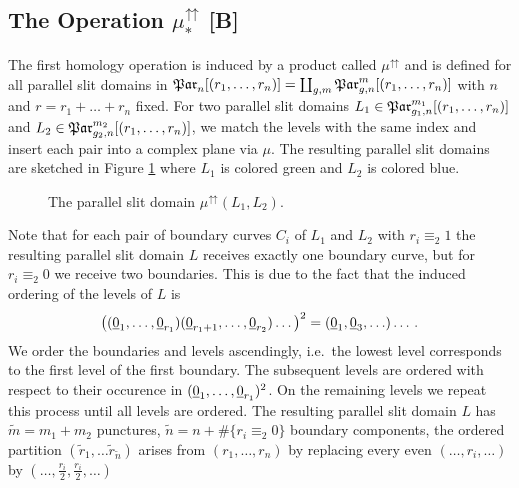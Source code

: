 \subsection{The Operation \texorpdfstring{$\mu^{\upuparrows}_\ast$}{muupuparrows*} [B]}
\label{homology_operations:parallel_patching_slit_pics:construction_of_mu_upuparrows}
The first homology operation is induced by a product called $\mu^{\upuparrows}$
\label{page:shorthand_par_n_r}%
and is defined for all parallel slit domains in $\Par_n[(r_1, \ldots, r_n)] = \coprod_{g,m} \Par_{g,n}^m[(r_1, \ldots, r_n)]$ with $n$ and $r=r_1 + \ldots + r_n$ fixed.
For two parallel slit domains $L_1 \in \Par_{g_1,n}^{m_1}[(r_1, \ldots, r_n)]$ and $L_2 \in \Par_{g_2,n}^{m_2}[(r_1, \ldots, r_n)]$,
we match the levels with the same index and insert each pair into a complex plane via $\mu$.
The resulting parallel slit domains are sketched in Figure \ref{homology_operations:parallel_patching_slit_pics:mu_upuparrows} where $L_1$ is colored green and $L_2$ is colored blue.
\begin{figure}[ht]
    \centering
    \def\svgwidth{.85\columnwidth}
    
    \caption{\label{homology_operations:parallel_patching_slit_pics:mu_upuparrows}The parallel slit domain $\mu^\upuparrows(L_1, L_2)$.}
\end{figure}
Note that for each pair of boundary curves $C_i$ of $L_1$ and $L_2$ with $r_i \equiv_{2} 1$ the resulting parallel slit domain $L$ receives exactly one boundary curve,
but for $r_i \equiv_{2} 0$ we receive two boundaries.
This is due to the fact that the induced ordering of the levels of $L$ is
\[
    \big( ( \ul0_1, \ldots, \ul0_{r_1} )( \ul0_{r_1+1}, \ldots, \ul0_{r_2} ) \ldots \big)^2 = ( \ul0_1, \ul0_3, \ldots ) \ldots \,.
\]
We order the boundaries and levels ascendingly, i.e.\ the lowest level corresponds to the first level of the first boundary.
The subsequent levels are ordered with respect to their occurence in $( \ul0_1, \ldots, \ul0_{r_1} )^2$.
On the remaining levels we repeat this process until all levels are ordered.
The resulting parallel slit domain $L$ has $\tilde m = m_1 + m_2$ punctures,
$\tilde n = n + \#\{ r_i \equiv_2 0\}$ boundary components,
the ordered partition $(\tilde r_1, \ldots \tilde r_{\tilde n})$ arises from $(r_1, \ldots, r_n)$ by replacing every even $(\ldots, r_i, \ldots )$ by $(\ldots, \frac{r_i}{2}, \frac{r_i}{2}, \ldots)$
